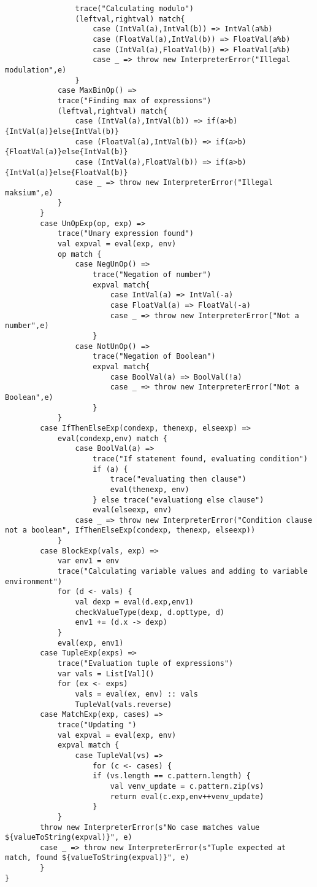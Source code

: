 \documentclass[a4paper, 10pt]{article}
\begin{document}
\begin{lstlisting}
				trace("Calculating modulo")
				(leftval,rightval) match{
					case (IntVal(a),IntVal(b)) => IntVal(a%b)
					case (FloatVal(a),IntVal(b)) => FloatVal(a%b)
					case (IntVal(a),FloatVal(b)) => FloatVal(a%b)
					case _ => throw new InterpreterError("Illegal modulation",e)
				}
			case MaxBinOp() =>
			trace("Finding max of expressions")
			(leftval,rightval) match{
				case (IntVal(a),IntVal(b)) => if(a>b){IntVal(a)}else{IntVal(b)}
				case (FloatVal(a),IntVal(b)) => if(a>b){FloatVal(a)}else{IntVal(b)}
				case (IntVal(a),FloatVal(b)) => if(a>b){IntVal(a)}else{FloatVal(b)}
				case _ => throw new InterpreterError("Illegal maksium",e)
			}
		}
		case UnOpExp(op, exp) =>
			trace("Unary expression found")
			val expval = eval(exp, env)
			op match {
				case NegUnOp() =>
					trace("Negation of number")
					expval match{
						case IntVal(a) => IntVal(-a)
						case FloatVal(a) => FloatVal(-a)
						case _ => throw new InterpreterError("Not a number",e)
					}
				case NotUnOp() =>
					trace("Negation of Boolean")
					expval match{
						case BoolVal(a) => BoolVal(!a)
						case _ => throw new InterpreterError("Not a Boolean",e)
					}
			}
		case IfThenElseExp(condexp, thenexp, elseexp) =>
			eval(condexp,env) match {
				case BoolVal(a) =>
					trace("If statement found, evaluating condition")
					if (a) {
						trace("evaluating then clause")
						eval(thenexp, env)
					} else trace("evaluationg else clause")
					eval(elseexp, env)
				case _ => throw new InterpreterError("Condition clause not a boolean", IfThenElseExp(condexp, thenexp, elseexp))
			}
		case BlockExp(vals, exp) =>
			var env1 = env
			trace("Calculating variable values and adding to variable environment")
			for (d <- vals) {
				val dexp = eval(d.exp,env1)
				checkValueType(dexp, d.opttype, d)
				env1 += (d.x -> dexp)
			}
			eval(exp, env1)
		case TupleExp(exps) =>
			trace("Evaluation tuple of expressions")
			var vals = List[Val]()
			for (ex <- exps)
				vals = eval(ex, env) :: vals
				TupleVal(vals.reverse)
		case MatchExp(exp, cases) =>
			trace("Updating ")
			val expval = eval(exp, env)
			expval match {
				case TupleVal(vs) =>
					for (c <- cases) {
					if (vs.length == c.pattern.length) {
						val venv_update = c.pattern.zip(vs)
						return eval(c.exp,env++venv_update)
					}
			}
		throw new InterpreterError(s"No case matches value ${valueToString(expval)}", e)
		case _ => throw new InterpreterError(s"Tuple expected at match, found ${valueToString(expval)}", e)
		}
}
\end{lstlisting}
\end{document}
